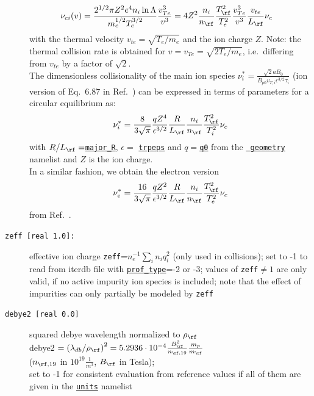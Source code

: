 \documentclass[12pt]{article}
\begin{document}
\begin{description}
\begin{align*}
 \nu_{ei}(v)
 &=\frac{2^{1/2}\pi
 Z^2e^4n_i\ln\Lambda}{m_e^{1/2}T_e^{3/2}}\frac{v_{Te}^3}{v^3}
 =4Z^2\frac{n_i}{n_{\rf}}\frac{T^2_{\rf}}{T^2_e}\frac{v_{Te}^3}{v^3}\frac{v_{te}}{L_{\rf}}\nu_c
\end{align*}
with the thermal velocity $v_{te}=\sqrt{T_e/m_e}$ and the ion charge $Z$. Note: the thermal collision rate is obtained for
$v=v_{Te}=\sqrt{2T_e/m_e}$, i.e.~differing from $v_{te}$ by a factor of $\sqrt{2}$.\\
The dimensionless collisionality of the main ion species $\nu^*_i = \frac{\sqrt{2} a B_0}{B_{p0} v_{T,i} \epsilon^{3/2} \tau_i}$ (ion version of
Eq.~6.87 in Ref.~\cite{HintonHazeltine1976}) can be expressed in terms of \gene parameters for a circular equilibrium as:
\begin{align*}
\nu^*_i = \frac{8}{3\sqrt{\pi}} \frac{q
Z^4}{\epsilon^{3/2}}\frac{R}{L_{\rf}}\frac{n_i}{n_{\rf}}\frac{T_{\rf}^2}{T^2_i}   \nu_c
\end{align*}
with $R/L_{\rf} = $\hyperlink{major_R}{\tt major\_R}, $\epsilon =$
\hyperlink{trpeps}{\tt trpeps} and
$q=$\hyperlink{q0}{\tt q0} from the \hyperlink{geometry_nml}{\tt
geometry} namelist and $Z$ is the ion charge.\\
In a similar fashion, we obtain the electron version
\begin{align*}
\nu^*_e = \frac{16}{3\sqrt{\pi}} \frac{q
Z^2}{\epsilon^{3/2}}\frac{R}{L_{\rf}}\frac{n_i}{n_{\rf}}\frac{T_{\rf}^2}{T^2_e}   \nu_c
\end{align*}
from Ref.~\cite{HintonHazeltine1976}.
\item[\hypertarget{zeff}{\tt zeff [real 1.0]:}] effective ion charge
\texttt{zeff}=$n_e^{-1}\sum_i n_i q_i^2$ (only used in collisions);
set to -1 to read from iterdb file with \hyperlink{prof_type}{\texttt{prof\_type}}=-2 or -3;
values of \texttt{zeff}$\ne 1$ are only valid, if no active impurity ion
species is included; note that the effect of impurities can only
partially be modeled by {\tt zeff}
\item[\texttt{debye2 [real 0.0]}] squared debye wavelength normalized to $\rho_\rf$\\
 debye2 $=\left(\lambda_{db}/\rho_\rf\right)^2=5.2936\cdot 10^{-4}\frac{B_\rf^2}{n_{\rf ,19}}\frac{m_p}{m_\rf}$\\
 ($n_{\rf ,19}$ in $10^{19}\frac{1}{m^3}$, $B_\rf$ in Tesla);\\
set to -1 for consistent evaluation from reference values if all of them are given
in the \hyperlink{units_nml}{\tt units} namelist
\end{description}
\end{document}
